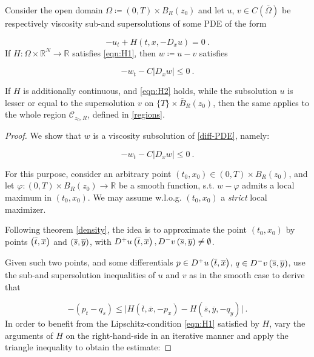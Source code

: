 \begin{theorem}
	\label{viscosity_loc}
	Consider the open domain $ \Omega \coloneqq \left( 0, T \right) \times B_R(z_0) $ and let $ u $, $ v \in C(\overline{\Omega}) $ be respectively viscosity sub-and supersolutions of some PDE of the form
	
	\begin{equation*}
	-u_t + H(t, x, -D_x u) = 0 \ .
	\end{equation*}
	If $ H : \Omega \times \mathbb{R}^{N} \to \mathbb{R} $ satisfies \eqref{eqn:H1}, then $ w \coloneqq u - v $ satisfies
	
	\begin{equation*}
	-w_t - C \lvert D_x w \rvert \leq 0 \ .
	\end{equation*}
	
	If $ H $ is additionally continuous, and \eqref{eqn:H2} holds, while the subsolution $ u $ is lesser or equal to the supersolution $ v $ on $ \{ T \} \times \overline{B}_R (z_0) $, then the same applies to the whole region $ \mathcal{C}_{z_0, R} $, defined in \ref{regions}.
		  	\begin{proof}
		  		We show that $ w $ is a viscosity subsolution of \eqref{diff-PDE}, namely:
		  		
		  		\begin{equation*}
		  			-w_t - C \lvert D_x w \rvert \leq 0 \ .
		  		\end{equation*}
		  		
		  		For this purpose, consider an arbitrary point $ (t_0, x_0) \in \left( 0, T \right) \times B_R(z_0) $, and let $ \varphi : \left( 0, T \right) \times B_R(z_0) \to \mathbb{R} $ be a smooth function, s.t. $ w - \varphi $ admits a local maximum in $ (t_0, x_0) $. We may assume w.l.o.g. $ (t_0, x_0) $ a \emph{strict} local maximizer.
		  		
		  		Following theorem \ref{density}, the idea is to approximate the point $ (t_0, x_0) $ by points $ \left(\overline{t}, \overline{x}\right) $ and $ \left(\overline{s}, \overline{y}\right) $, with $ D^{+} u \left(\overline{t}, \overline{x}\right), D^{-} v \left(\overline{s}, \overline{y}\right) \neq \emptyset $.
		  		
		  		Given such two points, and some differentials $ p \in D^{+} u \left(\overline{t}, \overline{x}\right) $, $ q \in D^{-} v \left(\overline{s}, \overline{y}\right) $, use the sub-and supersolution inequalities of $ u $ and $ v $ as in the smooth case to derive that
		  		
		  		\begin{equation*}
		  		-(p_t - q_s) \leq \lvert H(\overline{t}, \overline{x}, -p_x) - H(\overline{s}, \overline{y}, -q_y) \rvert \ .
		  		\end{equation*}
		  		In order to benefit from the Lipschitz-condition \eqref{eqn:H1} satisfied by $ H $, vary the arguments of $ H $ on the right-hand-side in an iterative manner and apply the triangle inequality to obtain the estimate:
		  		

\end{proof}
\end{theorem}
